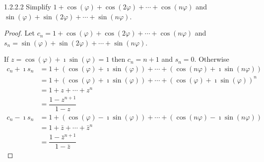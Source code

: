 \begin{problem}{1.2.2.2}
Simplify \( 1 + \cos(\varphi) + \cos(2\varphi) + \cdots + \cos(n\varphi) \) and \( \sin(\varphi) + \sin(2\varphi) + \cdots + \sin(n\varphi) \).
\end{problem}

\begin{proof}

	Let \( c_{n} =  1 + \cos(\varphi) + \cos(2\varphi) + \cdots + \cos(n\varphi) \) and \( s_{n} = \sin(\varphi) + \sin(2\varphi) + \cdots + \sin(n\varphi) \).

	If \( z = \cos(\varphi) + \imath\sin(\varphi) = 1 \) then \( c_{n} = n + 1 \) and \( s_{n} = 0 \). Otherwise
	\begingroup
	\allowdisplaybreaks%
	\begin{align*}
		c_{n} + \imath s_{n} & = 1 + (\cos(\varphi) + \imath\sin(\varphi)) + \cdots + {(\cos(n\varphi) + \imath\sin(n\varphi))}   \\
		                     & = 1 + (\cos(\varphi) + \imath\sin(\varphi)) + \cdots + {(\cos(\varphi) + \imath\sin(\varphi))}^{n} \\
		                     & = 1 + z + \cdots + z^{n}                                                                           \\
		                     & = \dfrac{1 - z^{n+1}}{1 - z}                                                                       \\
		c_{n} - \imath s_{n} & = 1 + (\cos(\varphi) - \imath\sin(\varphi)) + \cdots + {(\cos(n\varphi) - \imath\sin(n\varphi))}   \\
		                     & = 1 + \bar{z} + \cdots + \bar{z}^{n}                                                               \\
		                     & = \dfrac{1 - \bar{z}^{n+1}}{1 - \bar{z}}
	\end{align*}
	\endgroup


\end{proof}
